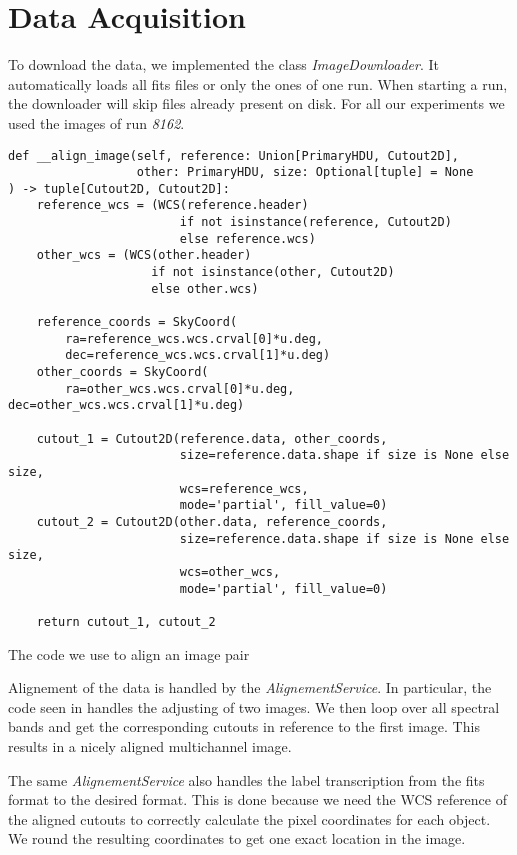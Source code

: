 \section{Data Acquisition}
To download the data, we implemented the class \emph{ImageDownloader}. It automatically loads all fits files or only the ones of one run. When starting a run, the downloader will skip files already present on disk.
For all our experiments we used the images of run \emph{8162}.

\begin{listing}
    \begin{verbatim}
def __align_image(self, reference: Union[PrimaryHDU, Cutout2D],
                  other: PrimaryHDU, size: Optional[tuple] = None
) -> tuple[Cutout2D, Cutout2D]:
    reference_wcs = (WCS(reference.header)
                        if not isinstance(reference, Cutout2D)
                        else reference.wcs)
    other_wcs = (WCS(other.header)
                    if not isinstance(other, Cutout2D)
                    else other.wcs)

    reference_coords = SkyCoord(
        ra=reference_wcs.wcs.crval[0]*u.deg,
        dec=reference_wcs.wcs.crval[1]*u.deg)
    other_coords = SkyCoord(
        ra=other_wcs.wcs.crval[0]*u.deg, dec=other_wcs.wcs.crval[1]*u.deg)

    cutout_1 = Cutout2D(reference.data, other_coords,
                        size=reference.data.shape if size is None else size,
                        wcs=reference_wcs,
                        mode='partial', fill_value=0)
    cutout_2 = Cutout2D(other.data, reference_coords,
                        size=reference.data.shape if size is None else size,
                        wcs=other_wcs,
                        mode='partial', fill_value=0)

    return cutout_1, cutout_2
        \end{verbatim}
    \label{alignementCode}
    \caption{The code we use to align an image pair}
\end{listing}

Alignement of the data is handled by the \emph{AlignementService}. In particular, the code seen in  handles the adjusting of two images. We then loop over all spectral bands and get the corresponding cutouts in reference to the first image. This results in a nicely aligned multichannel image.

The same \emph{AlignementService} also handles the label transcription from the fits format to the desired format. This is done because we need the WCS reference of the aligned cutouts to correctly calculate the pixel coordinates for each object.
We round the resulting coordinates to get one exact location in the image.

